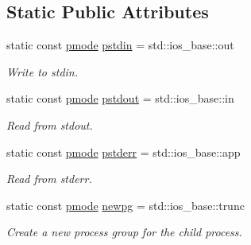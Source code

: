 \subsection*{Static Public Attributes}
\begin{DoxyCompactItemize}
\item 
\mbox{\label{structredi_1_1pstreams_a7a976ce992db857f86a0cc3352e42d3a}} 
static const \mbox{\hyperlink{structredi_1_1pstreams_a1eae4aad88812af03a0fbb3ec13c50b7}{pmode}} \mbox{\hyperlink{structredi_1_1pstreams_a7a976ce992db857f86a0cc3352e42d3a}{pstdin}} = std\+::ios\+\_\+base\+::out
\begin{DoxyCompactList}\small\item\em Write to stdin. \end{DoxyCompactList}\item 
\mbox{\label{structredi_1_1pstreams_ad3c6d53a98de4566478b1c40c101a42b}} 
static const \mbox{\hyperlink{structredi_1_1pstreams_a1eae4aad88812af03a0fbb3ec13c50b7}{pmode}} \mbox{\hyperlink{structredi_1_1pstreams_ad3c6d53a98de4566478b1c40c101a42b}{pstdout}} = std\+::ios\+\_\+base\+::in
\begin{DoxyCompactList}\small\item\em Read from stdout. \end{DoxyCompactList}\item 
\mbox{\label{structredi_1_1pstreams_a423b8ad263d442ba726b5f8e5812b7ef}} 
static const \mbox{\hyperlink{structredi_1_1pstreams_a1eae4aad88812af03a0fbb3ec13c50b7}{pmode}} \mbox{\hyperlink{structredi_1_1pstreams_a423b8ad263d442ba726b5f8e5812b7ef}{pstderr}} = std\+::ios\+\_\+base\+::app
\begin{DoxyCompactList}\small\item\em Read from stderr. \end{DoxyCompactList}\item 
\mbox{\label{structredi_1_1pstreams_a83cbc4d00cb5fb1e2f38403781367d12}} 
static const \mbox{\hyperlink{structredi_1_1pstreams_a1eae4aad88812af03a0fbb3ec13c50b7}{pmode}} \mbox{\hyperlink{structredi_1_1pstreams_a83cbc4d00cb5fb1e2f38403781367d12}{newpg}} = std\+::ios\+\_\+base\+::trunc
\begin{DoxyCompactList}\small\item\em Create a new process group for the child process. \end{DoxyCompactList}\end{DoxyCompactItemize}
